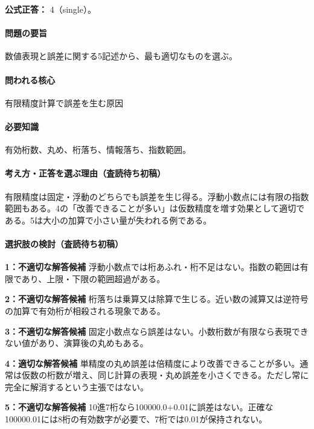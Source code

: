 \textbf{公式正答：} 4（single）。

\paragraph{問題の要旨} 数値表現と誤差に関する5記述から、最も適切なものを選ぶ。

\paragraph{問われる核心} 有限精度計算で誤差を生む原因

\paragraph{必要知識} 有効桁数、丸め、桁落ち、情報落ち、指数範囲。

\paragraph{考え方・正答を選ぶ理由（査読待ち初稿）} 有限精度は固定・浮動のどちらでも誤差を生じ得る。浮動小数点には有限の指数範囲もある。4の「改善できることが多い」は仮数精度を増す効果として適切である。5は大小の加算で小さい量が失われる例である。

\paragraph{選択肢の検討（査読待ち初稿）}\mbox{}\par

\noindent\textbf{1：不適切な解答候補} 浮動小数点では桁あふれ・桁不足はない。指数の範囲は有限であり、上限・下限の範囲超過がある。\par

\noindent\textbf{2：不適切な解答候補} 桁落ちは乗算又は除算で生じる。近い数の減算又は逆符号の加算で有効桁が相殺される現象である。\par

\noindent\textbf{3：不適切な解答候補} 固定小数点なら誤差はない。小数桁数が有限なら表現できない値があり、演算後の丸めもある。\par

\noindent\textbf{4：適切な解答候補} 単精度の丸め誤差は倍精度により改善できることが多い。通常は仮数の桁数が増え、同じ計算の表現・丸め誤差を小さくできる。ただし常に完全に解消するという主張ではない。\par

\noindent\textbf{5：不適切な解答候補} 10進7桁なら100000.0+0.01に誤差はない。正確な100000.01には8桁の有効数字が必要で、7桁では0.01が保持されない。\par

